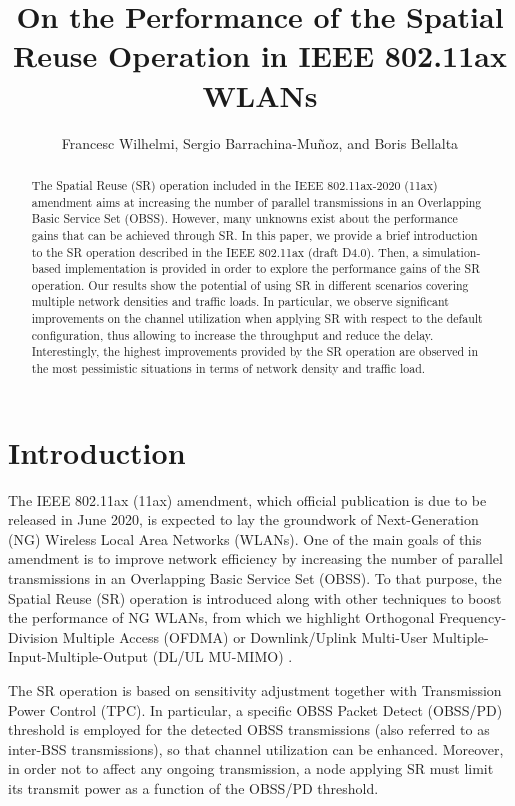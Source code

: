 \documentclass{article}
\begin{document}
	
	\title{On the Performance of the Spatial Reuse Operation in IEEE 802.11ax WLANs}
	\author{Francesc Wilhelmi,  Sergio Barrachina-Mu\~noz, and Boris Bellalta}
	\date{ }
	\maketitle
	
	\begin{abstract}
	The Spatial Reuse (SR) operation included in the IEEE 802.11ax-2020 (11ax) amendment aims at increasing the number of parallel transmissions in an Overlapping Basic Service Set (OBSS). However, many unknowns exist about the performance gains that can be achieved through SR. In this paper, we provide a brief introduction to the SR operation described in the IEEE 802.11ax (draft D4.0). Then, a simulation-based implementation is provided in order to explore the performance gains of the SR operation. Our results show the potential of using SR in different scenarios covering multiple network densities and traffic loads. In particular, we observe significant improvements on the channel utilization when applying SR with respect to the default configuration, thus allowing to increase the throughput and reduce the delay. Interestingly, the highest improvements provided by the SR operation are observed in the most pessimistic situations in terms of network density and traffic load.
	\end{abstract}
	
	\section{Introduction}
	
	The IEEE 802.11ax (11ax) amendment, which official publication is due to be released in June 2020, is expected to lay the groundwork of Next-Generation (NG) Wireless Local Area Networks (WLANs). One of the main goals of this amendment is to improve network efficiency by increasing the number of parallel transmissions in an Overlapping Basic Service Set (OBSS). To that purpose, the Spatial Reuse (SR) operation is introduced along with other techniques to boost the performance of NG WLANs, from which we highlight Orthogonal Frequency-Division Multiple Access (OFDMA) or Downlink/Uplink Multi-User  Multiple-Input-Multiple-Output (DL/UL MU-MIMO) \cite{bellalta2016ieee}.
	
	The SR operation is based on sensitivity adjustment together with Transmission Power Control (TPC). In particular, a specific OBSS Packet Detect (OBSS/PD) threshold is employed for the detected OBSS transmissions (also referred to as inter-BSS transmissions), so that channel utilization can be enhanced. Moreover, in order not to affect any ongoing transmission, a node applying SR must limit its transmit power as a function of the OBSS/PD threshold.
	
\end{document}
